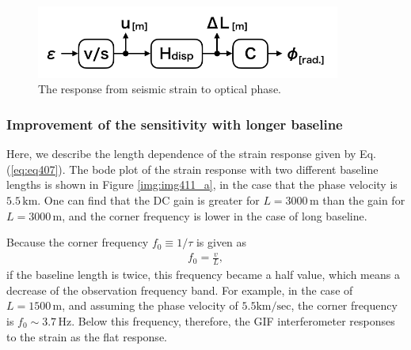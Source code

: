 \begin{figure}[h]
  \centering
  \includegraphics[width=10.0cm]{./img_chap4/img411.png}
  \caption{The response from seismic strain to optical phase.} \label{img:img411}
\end{figure}

\subsubsection{Improvement of the sensitivity with longer baseline}
Here, we describe the length dependence of the strain response given by Eq.(\ref{eq:eq407}). The bode plot of the strain response with two different baseline lengths is shown in Figure  \ref{img:img411_a}, in the case that the phase velocity is $5.5\,\mathrm{km}$. One can find that the DC gain is greater for $L=3000\,\mathrm{m}$ than the gain for $L=3000\,\mathrm{m}$, and the corner frequency is lower in the case of long baseline.

Because the corner frequency $f_0\equiv {1}/{\tau}$ is given as
\begin{eqnarray}
  f_0 = \frac{v}{L},
\end{eqnarray}
if the baseline length is twice, this frequency became a half value, which means a decrease of the observation frequency band. For example, in the case of $L=1500\,\mathrm{m}$, and assuming the phase velocity of $5.5 \mathrm{km/sec}$, the corner frequency is $f_0\sim3.7\,\mathrm{Hz}$. Below this frequency, therefore, the GIF interferometer responses to the strain as the flat response.

